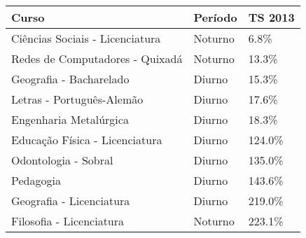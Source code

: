 \begin{tabular}{lll}
\toprule
                           Curso &  Período & TS 2013 \\
\midrule
 Ciências Sociais - Licenciatura &  Noturno &    6.8\% \\
 Redes de Computadores - Quixadá &  Noturno &   13.3\% \\
         Geografia - Bacharelado &   Diurno &   15.3\% \\
       Letras - Português-Alemão &   Diurno &   17.6\% \\
          Engenharia Metalúrgica &   Diurno &   18.3\% \\
  Educação Física - Licenciatura &   Diurno &  124.0\% \\
            Odontologia - Sobral &   Diurno &  135.0\% \\
                       Pedagogia &   Diurno &  143.6\% \\
        Geografia - Licenciatura &   Diurno &  219.0\% \\
        Filosofia - Licenciatura &  Noturno &  223.1\% \\
\bottomrule
\end{tabular}
